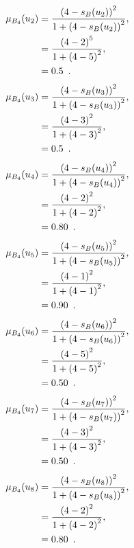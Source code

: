 \documentclass[a4paper,openany]{book}
\begin{document}
				\begin{align}
					\mu_{B_4}(u_2) &= \frac{\left(4-s_B(u_2)\right)^2}{1 + \left(4-s_B(u_2)\right)^2} ,\\
					&= \frac{\left(4-2\right)^5}{1 + \left(4-5\right)^2} \notag ,\\
					&= 0.5 \enspace. \notag
				\end{align}
				\begin{align}
					\mu_{B_4}(u_3) &= \frac{\left(4-s_B(u_3)\right)^2}{1 + \left(4-s_B(u_3)\right)^2} ,\\
					&= \frac{\left(4-3\right)^2}{1 + \left(4-3\right)^2} \notag ,\\
					&= 0.5 \enspace. \notag
				\end{align}
				\begin{align}
					\mu_{B_4}(u_4) &= \frac{\left(4-s_B(u_4)\right)^2}{1 + \left(4-s_B(u_4)\right)^2} ,\\
					&= \frac{\left(4-2\right)^2}{1 + \left(4-2\right)^2} \notag ,\\
					&= 0.80 \enspace. \notag
				\end{align}
				\begin{align}
					\mu_{B_4}(u_5) &= \frac{\left(4-s_B(u_5)\right)^2}{1 + \left(4-s_B(u_5)\right)^2} ,\\
					&= \frac{\left(4-1\right)^2}{1 + \left(4-1\right)^2} \notag ,\\
					&= 0.90 \enspace. \notag
				\end{align}
				\begin{align}
					\mu_{B_4}(u_6) &= \frac{\left(4-s_B(u_6)\right)^2}{1 + \left(4-s_B(u_6)\right)^2} ,\\
					&= \frac{\left(4-5\right)^2}{1 + \left(4-5\right)^2} \notag ,\\
					&= 0.50 \enspace. \notag
				\end{align}
				\begin{align}
					\mu_{B_4}(u_7) &= \frac{\left(4-s_B(u_7)\right)^2}{1 + \left(4-s_B(u_7)\right)^2} ,\\
					&= \frac{\left(4-3\right)^2}{1 + \left(4-3\right)^2} \notag ,\\
					&= 0.50 \enspace. \notag
				\end{align}
				\begin{align}
					\mu_{B_4}(u_8) &= \frac{\left(4-s_B(u_8)\right)^2}{1 + \left(4-s_B(u_8)\right)^2} ,\\
					&= \frac{\left(4-2\right)^2}{1 + \left(4-2\right)^2} \notag ,\\
					&= 0.80 \enspace. \notag
				\end{align}
\end{document}
